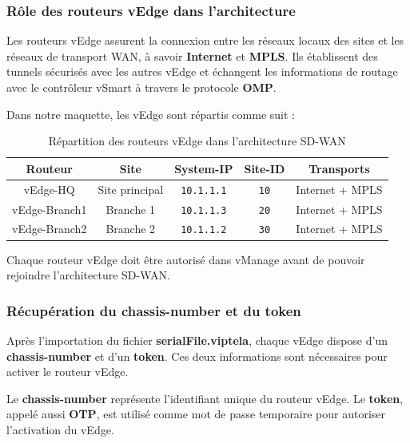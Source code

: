 \documentclass[12pt,a4paper,oneside]{report}
\begin{document}
	\subsubsection{Rôle des routeurs vEdge dans l'architecture}
	
	Les routeurs vEdge assurent la connexion entre les réseaux locaux des sites et les réseaux de transport WAN, à savoir \textbf{Internet} et \textbf{MPLS}. Ils établissent des tunnels sécurisés avec les autres vEdge et échangent les informations de routage avec le contrôleur vSmart à travers le protocole \textbf{OMP}.
	
	Dans notre maquette, les vEdge sont répartis comme suit :
	
	\begin{table}[H]
		\centering
		\renewcommand{\arraystretch}{1.2}
		\begin{tabular}{|c|c|c|c|c|}
			\hline
			\textbf{Routeur} & \textbf{Site} & \textbf{System-IP} & \textbf{Site-ID} & \textbf{Transports} \\
			\hline
			vEdge-HQ & Site principal & \texttt{10.1.1.1} & \texttt{10} & Internet + MPLS \\
			\hline
			vEdge-Branch1 & Branche 1 & \texttt{10.1.1.3} & \texttt{20} & Internet + MPLS \\
			\hline
			vEdge-Branch2 & Branche 2 & \texttt{10.1.1.2} & \texttt{30} & Internet + MPLS \\
			\hline
		\end{tabular}
		\caption{Répartition des routeurs vEdge dans l'architecture SD-WAN}
		\label{tab:repartition-vedge}
	\end{table}
	
	Chaque routeur vEdge doit être autorisé dans vManage avant de pouvoir rejoindre l'architecture SD-WAN.
	
	
	
	\subsubsection{Récupération du chassis-number et du token}
	
	Après l'importation du fichier \textbf{serialFile.viptela}, chaque vEdge dispose d'un \textbf{chassis-number} et d'un \textbf{token}. Ces deux informations sont nécessaires pour activer le routeur vEdge.
	
	Le \textbf{chassis-number} représente l'identifiant unique du routeur vEdge. Le \textbf{token}, appelé aussi \textbf{OTP}, est utilisé comme mot de passe temporaire pour autoriser l'activation du vEdge.
	
\end{document}
